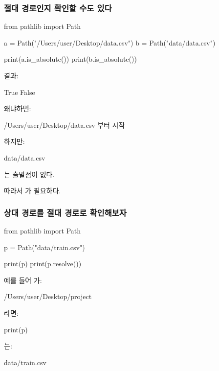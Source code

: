 \subsubsection{절대 경로인지 확인할 수도 있다}

\begin{dhkcode}
from pathlib import Path

a = Path("/Users/user/Desktop/data.csv")
b = Path("data/data.csv")

print(a.is_absolute())
print(b.is_absolute())
\end{dhkcode}

결과:

\begin{dhkzsh}
True
False
\end{dhkzsh}

왜냐하면:

\begin{dhksmry}
/Users/user/Desktop/data.csv
\ua
{}부터 시작
\end{dhksmry}

하지만:

\begin{dhkzsh}
data/data.csv
\end{dhkzsh}

는 출발점이 없다.

따라서 가 필요하다.

\subsubsection{상대 경로를 절대 경로로 확인해보자}

\begin{dhkcode}
from pathlib import Path

p = Path("data/train.csv")

print(p)
print(p.resolve())
\end{dhkcode}

예를 들어 가:

\begin{dhkzsh}
/Users/user/Desktop/project
\end{dhkzsh}

라면:

\begin{dhkcode}
print(p)
\end{dhkcode}

는:

\begin{dhkzsh}
data/train.csv
\end{dhkzsh}

